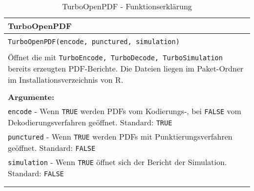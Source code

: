 \begin{longtable}{|p{\textwidth}|}
\hline
\rowcolor{lightblue}TurboOpenPDF\\
\hline
\\
\texttt{TurboOpenPDF(encode, punctured, simulation)}\\
\\
Öffnet die mit \texttt{TurboEncode, TurboDecode, TurboSimulation} bereits erzeugten PDF-Berichte. Die Dateien liegen im Paket-Ordner im Installationsverzeichnis von R.\\
\\
\textbf{Argumente:}\\
\texttt{encode} - Wenn \texttt{TRUE} werden PDFs vom Kodierungs-, bei \texttt{FALSE} vom Dekodierungsverfahren geöffnet. Standard: \texttt{TRUE}\\
\texttt{punctured} - Wenn \texttt{TRUE} werden PDFs mit Punktierungsverfahren geöffnet. Standard: \texttt{FALSE}\\
\texttt{simulation} - Wenn \texttt{TRUE} öffnet sich der Bericht der Simulation. Standard: \texttt{FALSE}\\
\\
\hline
\caption[TurboOpenPDF]{TurboOpenPDF - Funktionserklärung}
\end{longtable}
